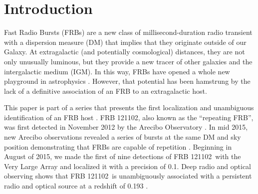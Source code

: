 \documentclass[twocolumn]{aastex61}
\newcommand{\frb}{FRB 121102}
\begin{document}
\author{R.~S.~Wharton}


\begin{abstract}
The millisecond radio transients known as Fast Radio Bursts have recently emerged as a mysterious, new class of astrophysical transient. The discovery of repeating bursts from \frb\ has shown that at least some FRBs are not cataclysmic and opened potential for studying FRB properties via a homogenous sample of bursts. The recent localization of \frb\ with the Very Large Array has helped measure its distance and a host of intrinsic properties. This localization was made with 9 bursts seen by the VLA in coordination the Arecibo, Effelsberg, and AMI-LA observatories. We present a detailed analysis of these bursts, including the first simultaneous detection of an FRB with multiple telescopes. We show that the burst spectra typically have a broad Gaussian shape on the scale of $\sim500$~MHz with fine spectral structure consistent with either scintillation or unresolved temporal structure. We present the luminosity distribution and temporal statistics for \frb\ and argue that the whole FRB population is adequately described by a single class similar to \frb. We close with thoughts on optimal strategies to make new interferometric localizations of FRBs.
\end{abstract}

\section{Introduction}
Fast Radio Bursts (FRBs) are a new class of millisecond-duration radio transient with a dispersion measure (DM) that implies that they originate outside of our Galaxy. At extragalactic (and potentially cosmological) distances, they are not only unusually luminous, but they provide a new tracer of other galaxies and the intergalactic medium (IGM). In this way, FRBs have opened a whole new playground in astrophysics \citep[e.g.,][]{2014A&A...562A.137F, 2014ApJ...780L..33M, 2016MNRAS.457..232C}. However, that potential has been hamstrung by the lack of a definitive association of an FRB to an extragalactic host.

This paper is part of a series that presents the first localization and unambiguous identification of an FRB host \citep{LOC, OPT, EVN}. \frb, also known as the ``repeating FRB'', was first detected in November 2012 by the Arecibo Observatory \citep{2014ApJ...790..101S}. In mid 2015, new Arecibo observations revealed a series of bursts at the same DM and sky position demonstrating that FRBs are capable of repetition \citep{2016Natur.531..202S}. Beginning in August of 2015, we made the first of nine detections of \frb\ with the Very Large Array \citep{LOC} and localized it with a precision of 0.1\arcsec. Deep radio and optical observing shows that \frb\ is unambiguously associated with a persistent radio and optical source at a redshift of 0.193 \citep{OPT, EVN}.
\end{document}
